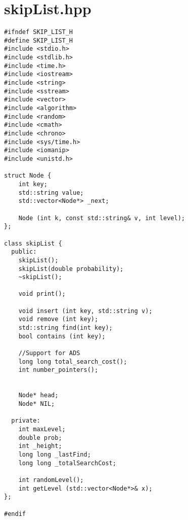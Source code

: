 
\section{skipList.hpp}
\begin{lstlisting}[caption=Code from file skipList.hpp, style=myC]
#ifndef SKIP_LIST_H
#define SKIP_LIST_H
#include <stdio.h>
#include <stdlib.h>
#include <time.h>
#include <iostream>
#include <string>
#include <sstream>
#include <vector>
#include <algorithm>
#include <random>
#include <cmath>
#include <chrono>
#include <sys/time.h>
#include <iomanip>
#include <unistd.h>

struct Node {
    int key;
    std::string value;
    std::vector<Node*> _next;
    
    Node (int k, const std::string& v, int level);
};

class skipList {
  public:
    skipList();
    skipList(double probability);
    ~skipList();

    void print();

    void insert (int key, std::string v);
    void remove (int key);
    std::string find(int key);
    bool contains (int key);

    //Support for ADS
    long long total_search_cost();
    int number_pointers();


    Node* head;
    Node* NIL;

  private:
    int maxLevel;
    double prob;
    int _height;
    long long _lastFind;
    long long _totalSearchCost;

    int randomLevel();
    int getLevel (std::vector<Node*>& x);
};

#endif
\end{lstlisting}


